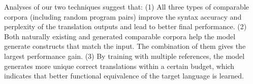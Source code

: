 Analyses of our two techniques suggest that:
(1) All three types of comparable corpora (including random program pairs) improve the syntax accuracy and perplexity of the translation outputs and lead to better final performance.
(2) Both naturally existing and generated comparable corpora help the model generate constructs that match the input. The combination of them gives the largest performance gain.
(3) By training with multiple references, the model generates more unique correct translations within a certain budget, which indicates that better functional equivalence of the target language is learned.





